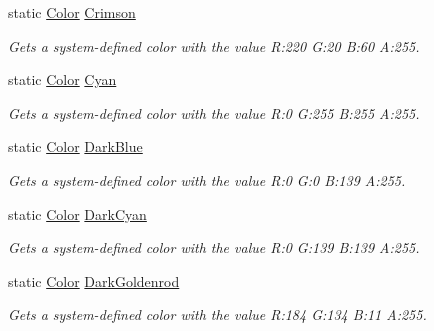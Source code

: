 \begin{DoxyCompactItemize}
static \hyperlink{struct_microsoft_1_1_xna_1_1_framework_1_1_color}{Color} \hyperlink{struct_microsoft_1_1_xna_1_1_framework_1_1_color_a4ad735d5d7f0f080ec3d2cceb3528dd6}{Crimson}
\begin{DoxyCompactList}\small\item\em Gets a system-\/defined color with the value R\+:220 G\+:20 B\+:60 A\+:255.\end{DoxyCompactList}\item 
static \hyperlink{struct_microsoft_1_1_xna_1_1_framework_1_1_color}{Color} \hyperlink{struct_microsoft_1_1_xna_1_1_framework_1_1_color_a2af3041298a216a8a3e6064d23cfc4d1}{Cyan}
\begin{DoxyCompactList}\small\item\em Gets a system-\/defined color with the value R\+:0 G\+:255 B\+:255 A\+:255.\end{DoxyCompactList}\item 
static \hyperlink{struct_microsoft_1_1_xna_1_1_framework_1_1_color}{Color} \hyperlink{struct_microsoft_1_1_xna_1_1_framework_1_1_color_a076c8233f6cf5d0f167e1ded25c682a2}{Dark\+Blue}
\begin{DoxyCompactList}\small\item\em Gets a system-\/defined color with the value R\+:0 G\+:0 B\+:139 A\+:255.\end{DoxyCompactList}\item 
static \hyperlink{struct_microsoft_1_1_xna_1_1_framework_1_1_color}{Color} \hyperlink{struct_microsoft_1_1_xna_1_1_framework_1_1_color_a121e43784692d3436c5f568da1a79cca}{Dark\+Cyan}
\begin{DoxyCompactList}\small\item\em Gets a system-\/defined color with the value R\+:0 G\+:139 B\+:139 A\+:255.\end{DoxyCompactList}\item 
static \hyperlink{struct_microsoft_1_1_xna_1_1_framework_1_1_color}{Color} \hyperlink{struct_microsoft_1_1_xna_1_1_framework_1_1_color_abfc19b36cf57bccb23327191b63981ec}{Dark\+Goldenrod}
\begin{DoxyCompactList}\small\item\em Gets a system-\/defined color with the value R\+:184 G\+:134 B\+:11 A\+:255.\end{DoxyCompactList}\item 

\end{DoxyCompactItemize}
